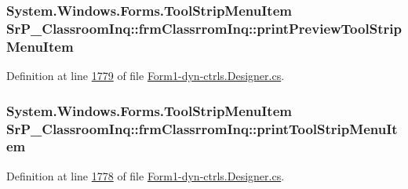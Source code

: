\hypertarget{class_sr_p___classroom_inq_1_1frm_classrrom_inq_a56c14d36b467c4787937369037c22717}{
\subsubsection[{print\-Preview\-Tool\-Strip\-Menu\-Item}]{\setlength{\rightskip}{0pt plus 5cm}\-System.\-Windows.\-Forms.\-Tool\-Strip\-Menu\-Item {\bf \-Sr\-P\-\_\-\-Classroom\-Inq\-::frm\-Classrrom\-Inq\-::print\-Preview\-Tool\-Strip\-Menu\-Item}}}
\label{class_sr_p___classroom_inq_1_1frm_classrrom_inq_a56c14d36b467c4787937369037c22717}


\-Definition at line \hyperlink{_form1-dyn-ctrls_8_designer_8cs_source_l01779}{1779} of file \hyperlink{_form1-dyn-ctrls_8_designer_8cs_source}{\-Form1-\/dyn-\/ctrls.\-Designer.\-cs}.

\hypertarget{class_sr_p___classroom_inq_1_1frm_classrrom_inq_ab2355ecf8174002162a103a7e7ee83f4}{
\subsubsection[{print\-Tool\-Strip\-Menu\-Item}]{\setlength{\rightskip}{0pt plus 5cm}\-System.\-Windows.\-Forms.\-Tool\-Strip\-Menu\-Item {\bf \-Sr\-P\-\_\-\-Classroom\-Inq\-::frm\-Classrrom\-Inq\-::print\-Tool\-Strip\-Menu\-Item}}}
\label{class_sr_p___classroom_inq_1_1frm_classrrom_inq_ab2355ecf8174002162a103a7e7ee83f4}


\-Definition at line \hyperlink{_form1-dyn-ctrls_8_designer_8cs_source_l01778}{1778} of file \hyperlink{_form1-dyn-ctrls_8_designer_8cs_source}{\-Form1-\/dyn-\/ctrls.\-Designer.\-cs}.

